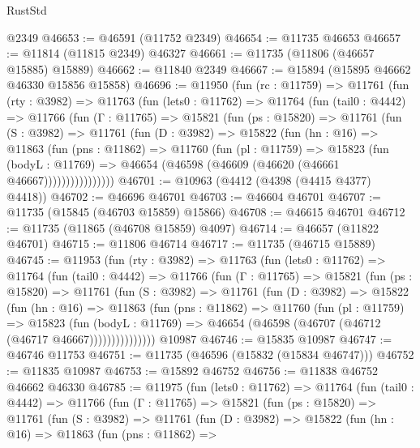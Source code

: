 \begin{lexlean}{RustStd}
\begin{coremodule}
    @2349
@46653 := @46591 (@11752 @2349)
@46654 := @11735 @46653
@46657 := @11814 (@11815 @2349) @46327
@46661 := @11735 (@11806 (@46657 @15885) @15889)
@46662 := @11840 @2349
@46667 := @15894 (@15895 @46662 @46330 @15856 @15858)
@46696 := @11950
    (fun (rc : @11759) =>
    @11761
      (fun (rty : @3982) =>
      @11763
        (fun (lets0 : @11762) =>
        @11764
          (fun (tail0 : @4442) =>
          @11766
            (fun (Γ : @11765) =>
            @15821
              (fun (ps : @15820) =>
              @11761
                (fun (S : @3982) =>
                @11761
                  (fun (D : @3982) =>
                  @15822
                    (fun (hn : @16) =>
                    @11863
                      (fun (pns : @11862) =>
                      @11760
                        (fun (pl : @11759) =>
                        @15823
                          (fun (bodyL : @11769) =>
                          @46654 (@46598 (@46609 (@46620 (@46661 @46667))))))))))))))))
@46701 := @10963 (@4412 (@4398 (@4415 @4377) @4418))
@46702 := @46696 @46701
@46703 := @46604 @46701
@46707 := @11735 (@15845 (@46703 @15859) @15866)
@46708 := @46615 @46701
@46712 := @11735 (@11865 (@46708 @15859) @4097)
@46714 := @46657 (@11822 @46701)
@46715 := @11806 @46714
@46717 := @11735 (@46715 @15889)
@46745 := @11953
    (fun (rty : @3982) =>
    @11763
      (fun (lets0 : @11762) =>
      @11764
        (fun (tail0 : @4442) =>
        @11766
          (fun (Γ : @11765) =>
          @15821
            (fun (ps : @15820) =>
            @11761
              (fun (S : @3982) =>
              @11761
                (fun (D : @3982) =>
                @15822
                  (fun (hn : @16) =>
                  @11863
                    (fun (pns : @11862) =>
                    @11760
                      (fun (pl : @11759) =>
                      @15823
                        (fun (bodyL : @11769) =>
                        @46654 (@46598 (@46707 (@46712 (@46717 @46667)))))))))))))))
    @10987
@46746 := @15835 @10987
@46747 := @46746 @11753
@46751 := @11735 (@46596 (@15832 (@15834 @46747)))
@46752 := @11835 @10987
@46753 := @15892 @46752
@46756 := @11838 @46752 @46662 @46330
@46785 := @11975
    (fun (lets0 : @11762) =>
    @11764
      (fun (tail0 : @4442) =>
      @11766
        (fun (Γ : @11765) =>
        @15821
          (fun (ps : @15820) =>
          @11761
            (fun (S : @3982) =>
            @11761
              (fun (D : @3982) =>
              @15822
                (fun (hn : @16) =>
                @11863
                  (fun (pns : @11862) =>

\end{coremodule}
\end{lexlean}
